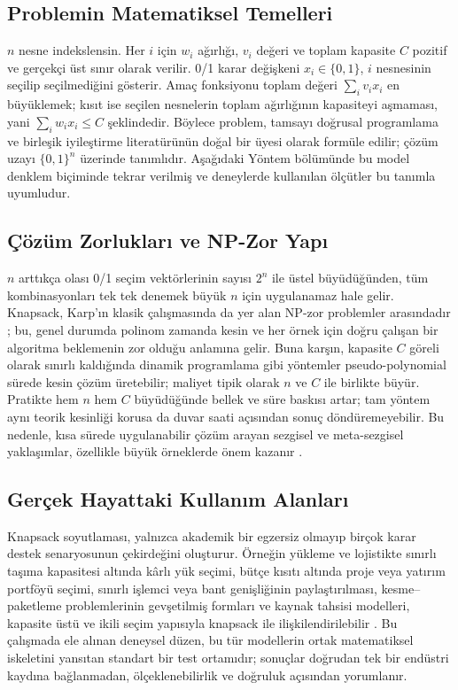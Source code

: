 \documentclass[conference,a4paper]{IEEEtran}
\begin{document}
\subsection{Problemin Matematiksel Temelleri}
$n$ nesne indekslensin. Her $i$ için $w_i$ ağırlığı, $v_i$ değeri ve toplam kapasite $C$ pozitif ve gerçekçi üst sınır olarak verilir. 0/1 karar değişkeni $x_i \in \{0,1\}$, $i$ nesnesinin seçilip seçilmediğini gösterir. Amaç fonksiyonu toplam değeri $\sum_i v_i x_i$ en büyüklemek; kısıt ise seçilen nesnelerin toplam ağırlığının kapasiteyi aşmaması, yani $\sum_i w_i x_i \leq C$ şeklindedir. Böylece problem, tamsayı doğrusal programlama ve birleşik iyileştirme literatürünün doğal bir üyesi olarak formüle edilir; çözüm uzayı $\{0,1\}^n$ üzerinde tanımlıdır. Aşağıdaki Yöntem bölümünde bu model denklem biçiminde tekrar verilmiş ve deneylerde kullanılan ölçütler bu tanımla uyumludur.

\subsection{Çözüm Zorlukları ve NP-Zor Yapı}
$n$ arttıkça olası 0/1 seçim vektörlerinin sayısı $2^n$ ile üstel büyüdüğünden, tüm kombinasyonları tek tek denemek büyük $n$ için uygulanamaz hale gelir. Knapsack, Karp'ın klasik çalışmasında da yer alan NP-zor problemler arasındadır \cite{karp1972reducibility}; bu, genel durumda polinom zamanda kesin ve her örnek için doğru çalışan bir algoritma beklemenin zor olduğu anlamına gelir. Buna karşın, kapasite $C$ göreli olarak sınırlı kaldığında dinamik programlama gibi yöntemler pseudo-polynomial sürede kesin çözüm üretebilir; maliyet tipik olarak $n$ ve $C$ ile birlikte büyür. Pratikte hem $n$ hem $C$ büyüdüğünde bellek ve süre baskısı artar; tam yöntem aynı teorik kesinliği korusa da duvar saati açısından sonuç döndüremeyebilir. Bu nedenle, kısa sürede uygulanabilir çözüm arayan sezgisel ve meta-sezgisel yaklaşımlar, özellikle büyük örneklerde önem kazanır \cite{kellerer2004knapsack}.

\subsection{Gerçek Hayattaki Kullanım Alanları}
Knapsack soyutlaması, yalnızca akademik bir egzersiz olmayıp birçok karar destek senaryosunun çekirdeğini oluşturur. Örneğin yükleme ve lojistikte sınırlı taşıma kapasitesi altında kârlı yük seçimi, bütçe kısıtı altında proje veya yatırım portföyü seçimi, sınırlı işlemci veya bant genişliğinin paylaştırılması, kesme--paketleme problemlerinin gevşetilmiş formları ve kaynak tahsisi modelleri, kapasite üstü ve ikili seçim yapısıyla knapsack ile ilişkilendirilebilir \cite{martello1990knapsack,kellerer2004knapsack}. Bu çalışmada ele alınan deneysel düzen, bu tür modellerin ortak matematiksel iskeletini yansıtan standart bir test ortamıdır; sonuçlar doğrudan tek bir endüstri kaydına bağlanmadan, ölçeklenebilirlik ve doğruluk açısından yorumlanır.
\end{document}
